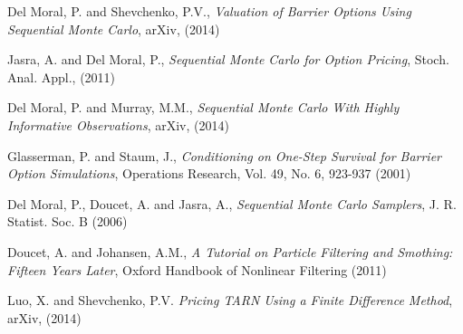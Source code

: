 \documentclass{article}
\begin{document}
\begin{thebibliography}{76}

  Del Moral, P. and Shevchenko, P.V.,
  \emph{Valuation of Barrier Options Using Sequential Monte Carlo},
  arXiv, (2014)

  Jasra, A. and Del Moral, P.,
  \emph{Sequential Monte Carlo for Option Pricing},
  Stoch. Anal. Appl., (2011)

  Del Moral, P. and Murray, M.M.,
  \emph{Sequential Monte Carlo With Highly Informative Observations},
  arXiv, (2014)

  Glasserman, P. and Staum, J.,
  \emph{Conditioning on One-Step Survival for Barrier Option Simulations},
  Operations Research, Vol. 49, No. 6, 923-937 (2001)

 Del Moral, P., Doucet, A. and Jasra, A.,
  \emph{Sequential Monte Carlo Samplers},
  J. R. Statist. Soc. B (2006)

Doucet, A. and Johansen, A.M.,
  \emph{A Tutorial on Particle Filtering and Smothing: Fifteen Years Later},
  Oxford Handbook of Nonlinear Filtering (2011)

Luo, X. and Shevchenko, P.V.
  \emph{Pricing TARN Using a Finite Difference Method},
  arXiv, (2014)


\end{thebibliography}
\end{document}
